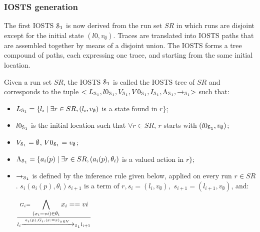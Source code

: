 
\subsubsection{IOSTS generation}
\label{sec:iosts-gen}

The first IOSTS $\EuScript{S}_1$ is now derived from the run set
$SR$ in which runs are disjoint except for the initial state
$(l0,v_\emptyset)$. Traces are translated into IOSTS paths that
are assembled together by means of a disjoint union. The IOSTS
forms a tree compound of paths, each expressing one trace, and
starting from the same initial location.

\begin{definition}
\label{IOSTS_tree}
Given a run set $SR$, the IOSTS $\EuScript{S}_1$ is called the
IOSTS tree of $SR$ and corresponds to the tuple
$<L_{\EuScript{S}_1}, l0_{\EuScript{S}_1},V_{\EuScript{S}_1},
V0_{\EuScript{S}_1}, I_{\EuScript{S}_1},
\Lambda_{\EuScript{S}_1},\rightarrow_{\EuScript{S}_1}>$ such
that:

\begin{itemize}

\item $L_{\EuScript{S}_1}= \{l_i \mid \exists r\in SR, (l_i,v_\emptyset)$ is
a state found in $r\}$;

\item $l0_{\EuScript{S}_1}$ is the initial location such that $\forall r \in
SR$, $r$ starts with $(l0_{\EuScript{S}_1},v_\emptyset)$;

\item $V_{\EuScript{S}_1}=\emptyset$,
    $V0_{\EuScript{S}_1}=v_\emptyset$;

\item $\Lambda_{\EuScript{S}_1}= \{a_i(p) \mid \exists r\in SR,
(a_i(p),\theta_i)$ is a valued action in $r\}$;

\item $\rightarrow_{\EuScript{S}_1}$ is defined by the
    inference rule given below, applied on every run $r\in SR$.
    $s_i (a_i(p),\theta_i) s_{i+1} \text{ is a term of } r,
    s_i=(l_i,v_\emptyset),$ $s_{i+1}=(l_{i+1},v_\emptyset)$, and:

    \begin{center}
    {\Large
        $\frac{G_i=\displaystyle \bigwedge_{(x_i=vi)\in \theta_i} x_i==vi}
        {l_i \xrightarrow{a_i(p),G_i,(x:=x)_{x\in V}}_{\EuScript{S}_1} l_{i+1}}$
    }
    \end{center}

\end{itemize}
\end{definition}

